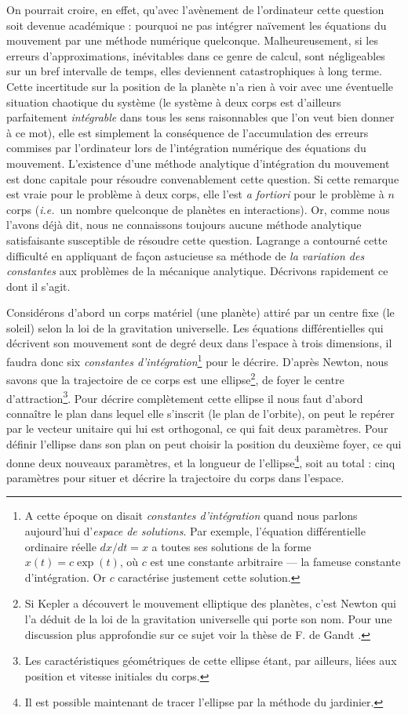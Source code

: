 \documentclass[12pt,paperletter, reqno]{amsart}
\newcommand{\ie}{\textit{i.e.}}
\theoremstyle{plain}
\theoremstyle{remark}
\begin{document}
  On pourrait croire,
  en effet,
  qu'avec l'avènement de l'ordinateur cette question soit devenue académique :
  pourquoi ne pas intégrer naïvement les équations du mouvement par une méthode numérique quelconque.
  Malheureusement,
  si les erreurs d'approximations,
  inévitables dans ce genre de calcul,
  sont négligeables sur un bref intervalle de temps,
  elles deviennent catastrophiques à long terme.
  Cette incertitude sur la position de la planète n'a rien à voir avec une éventuelle situation chaotique du système (le système à deux corps est d'ailleurs parfaitement \emph{intégrable} dans tous les sens raisonnables que l'on veut bien donner à ce mot),
  elle est simplement la conséquence de l'accumulation des erreurs commises par l'ordinateur lors de l'intégration numérique des équations du mouvement.
  L'existence d'une méthode analytique d'intégration du mouvement est donc capitale pour résoudre convenablement cette question.
  Si cette remarque est vraie pour le problème à deux corps,
  elle l'est \emph{a fortiori} pour le problème à $n$ corps (\ie\ un nombre quelconque de planètes en interactions).
  Or,
  comme nous l'avons déjà dit,
  nous ne connaissons toujours aucune méthode analytique satisfaisante susceptible de résoudre cette question.
  Lagrange a contourné cette difficulté en appliquant de façon astucieuse sa méthode de \emph{la variation des constantes} aux problèmes de la mécanique analytique.
  Décrivons rapidement ce dont il s'agit.
  
  Considérons d'abord un corps matériel (une planète) attiré par un centre fixe (le soleil) selon la loi de la gravitation universelle.
  Les équations différentielles qui décrivent son mouvement sont de degré deux dans l'espace à trois dimensions,
  il faudra donc six \emph{constantes d'intégration}\footnote{A cette époque on disait \emph{constantes d'intégration} quand nous parlons aujourd'hui d'\emph{espace de solutions}. Par exemple, l'équation différentielle ordinaire réelle $dx/dt=x$ a toutes ses solutions de la forme $x(t)=c\exp(t)$, où $c$ est une constante arbitraire --- la fameuse constante d'intégration. Or $c$ caractérise justement cette solution.} pour le décrire.
  D'après Newton,
  nous savons que la trajectoire de ce corps est une ellipse\footnote{Si Kepler a découvert le mouvement elliptique des planètes, c'est Newton qui l'a \og déduit\fg{} de la loi de la gravitation universelle qui porte son nom. Pour une discussion plus approfondie sur ce sujet voir la thèse de F. de Gandt \cite{deGandt1}.},
  de foyer le centre d'attraction\footnote{Les caractéristiques géométriques de cette ellipse étant, par ailleurs, liées aux position et vitesse initiales du corps.}.
  Pour décrire complètement cette ellipse il nous faut d'abord connaître le plan dans lequel elle s'inscrit (le plan de l'orbite),
  on peut le repérer par le vecteur unitaire qui lui est orthogonal,
  ce qui fait deux paramètres.
  Pour définir l'ellipse dans son plan on peut choisir la position du deuxième foyer,
  ce qui donne deux nouveaux paramètres,
  et la longueur de l'ellipse\footnote{Il est possible maintenant de tracer l'ellipse par la méthode du jardinier.},
  soit au total :
  cinq paramètres pour situer et décrire la trajectoire du corps dans l'espace.
  
\end{document}

